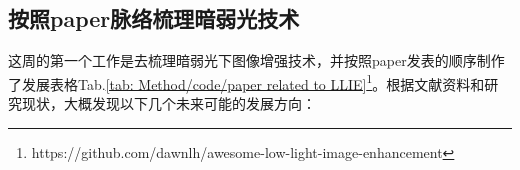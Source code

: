\documentclass[letterpaper,12pt]{article}
\begin{document}
		\subsection{按照paper脉络梳理暗弱光技术}
			
		这周的第一个工作是去梳理暗弱光下图像增强技术，并按照paper发表的顺序制作了发展表格Tab.\ref{tab: Method/code/paper related to LLIE}\footnote{https://github.com/dawnlh/awesome-low-light-image-enhancement}。根据文献资料和研究现状，大概发现以下几个未来可能的发展方向：
		
		\begin{table}[!htbp]
			\centering
			\tiny
\end{table}
\end{document}
